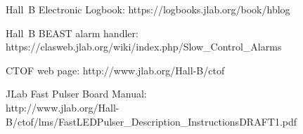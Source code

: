 \documentclass[12pt]{article}
\begin{document}
\clearpage

\vfil
\eject

\begin{thebibliography}{99}

Hall~B Electronic Logbook: https://logbooks.jlab.org/book/hblog

Hall~B BEAST alarm handler: \\
https://clasweb.jlab.org/wiki/index.php/Slow\_Control\_Alarms

CTOF web page: http://www.jlab.org/Hall-B/ctof

JLab Fast Pulser Board Manual:\\
http://www.jlab.org/Hall-B/ctof/lms/FastLEDPulser\_Description\_InstructionsDRAFT1.pdf 

\end{thebibliography}
\end{document}
